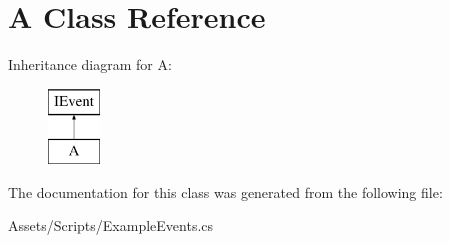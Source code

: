 \hypertarget{class_a}{}\section{A Class Reference}
\label{class_a}
Inheritance diagram for A\+:\begin{figure}[H]
\begin{center}
\leavevmode
\includegraphics[height=2.000000cm]{class_a}
\end{center}
\end{figure}


The documentation for this class was generated from the following file\+:\begin{DoxyCompactItemize}
\item 
Assets/\+Scripts/Example\+Events.\+cs\end{DoxyCompactItemize}
